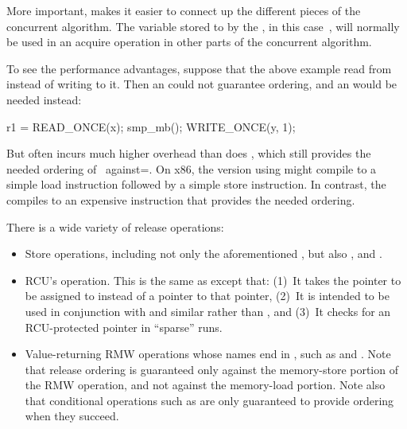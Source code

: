 More important,  makes it easier to connect up the
different pieces of the concurrent algorithm.
The variable stored to by the , in this case~,
will normally be used in an acquire operation in other parts of the
concurrent algorithm.

To see the performance advantages, suppose that the above example read
from~ instead of writing to it.
Then an  could not guarantee ordering, and an 
would be needed instead:

\begin{VerbatimU}
	r1 = READ_ONCE(x);
	smp_mb();
	WRITE_ONCE(y, 1);
\end{VerbatimU}

But  often incurs much higher overhead than does
, which still provides the needed ordering of~
against=.
On x86, the version using  might compile
to a simple load instruction followed by a simple store instruction.
In contrast, the  compiles to an expensive instruction that
provides the needed ordering.

There is a wide variety of release operations:

\begin{itemize}
 \item	Store operations, including not only the aforementioned
	, but also , and
	.

 \item	RCU's  operation.  This is the same as
	 except that:
	(1)~It takes the pointer to be assigned to instead of a pointer
	to that pointer, (2)~It is intended to be used in conjunction with
	 and similar rather than ,
	and (3)~It checks for an RCU-protected pointer in ``sparse'' runs.

 \item	Value-returning RMW operations whose names end in ,
	such as  and .
	Note that release ordering is guaranteed only against the
	memory-store portion of the RMW operation, and not against the
	memory-load portion.
	Note also that conditional operations such as 
	are only guaranteed to provide ordering when they succeed.
\end{itemize}

